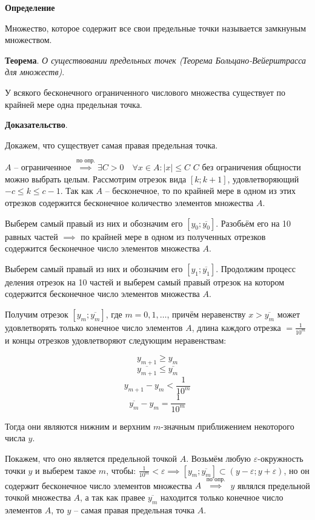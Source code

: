 \documentclass{article}
\newcommand{\bydef}{\stackrel{\text{по опр.}}{\implies}} %
\newcommand{\parspace}{\vspace{10pt}}
\theoremstyle{break}
\begin{document}
\textbf{Определение}

Множество, которое содержит все свои предельные точки называется замкнуным множеством.

\parspace

\textbf{Теорема}. \textit{О существовании предельных точек (Теорема Больцано-Вейерштрасса для множеств)}.

У всякого бесконечного ограниченного числового множества существует по крайней мере
одна предельная точка.

\textbf{Доказательство}.

Докажем, что существует самая правая предельная точка.

$A$ -- ограниченное $\bydef \exists C > 0 \quad
\forall x \in A: |x| \le C$
$C$ без ограничения общности можно выбрать целым.
Рассмотрим отрезок вида $[k;k+1]$, удовлетворяющий $-c \le k \le c - 1$.
Так как $A$ -- бесконечное, то по крайней мере в одном из этих отрезков содержится
бесконечное количество элементов множества $A$.

Выберем самый правый из них и обозначим его $[y_0;\overline{y_0}]$.
Разобьём его на 10 равных частей $\implies$ по крайней мере в одном из
полученных отрезков содержится бесконечное число элементов множества $A$.

Выберем самый правый из них и обозначим его $[y_1;\overline{y_1}]$.
Продолжим процесс деления отрезок на 10 частей и выберем самый правый отрезок
на котором содержится бесконечное число элементов множества $A$.

Получим отрезок $[y_m;\overline{y_m}]$, где $m = 0,1,\dots$, причём неравенству
$x > \overline{y_m}$ может удовлетворять только конечное число элементов $A$,
длина каждого отрезка $= \frac{1}{10^m}$ и концы отрезков удовлетворяют
следующим неравенствам:

\[y_{m+1} \ge y_m\]
\[\overline{y_{m+1}} \le \overline{y_m}\]
\[y_{m+1} - y_m < \frac{1}{10^m}\]
\[\overline{y_m} - y_m = \frac{1}{10^m}\]

Тогда они являются нижним и верхним $m$-значным приближением некоторого числа $y$.

Покажем, что оно является предельной точкой $A$. Возьмём любую $\varepsilon$-окружность
точки $y$ и выберем такое $m$, чтобы: 
$\frac{1}{10^m} < \varepsilon \implies [y_m;\overline{y_m}] \subset 
(y - \varepsilon; y + \varepsilon)$, но он содержит бесконечное число элементов
множества $A$ $\bydef$ $y$ являлся предельной точкой
множества $A$, а так как правее $\overline{y_m}$ находится только конечное число
элементов $A$, то $y$ -- самая правая предельная точка $A$.
\end{document}
